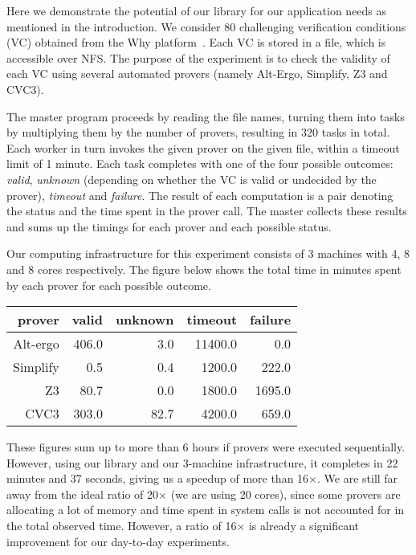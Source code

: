 \documentclass[tfpsymp,pagenumbers]{tfp07symp}
\begin{document}
Here we demonstrate the potential of our library for our application
needs as mentioned in the introduction. 
We consider 80 challenging verification conditions
(VC) obtained from the Why platform~\cite{filliatre07cav}.  Each
VC is stored in a file, which is accessible over
NFS. The purpose of the experiment is to check the validity of each VC
using several automated provers (namely Alt-Ergo, Simplify, Z3 and CVC3).

The master program proceeds by reading the file names, turning them
into tasks by multiplying them by the number of provers, resulting in
320 tasks in total.
Each worker in turn invokes the given prover on the given file, within
a timeout limit of 1 minute.
Each task completes with one of the four possible outcomes: \emph{valid},
\emph{unknown} (depending on
whether the VC is valid or undecided by the prover), 
\emph{timeout} and \emph{failure}.
The result of each computation is a pair denoting the status and the
time spent in the prover call. The master collects these results and
sums up the timings for each prover and each possible status.

Our computing
infrastructure for this experiment consists of 3 machines with 4, 8 and 8 cores
respectively. 
The figure below shows the total time in minutes spent by each prover
for each possible outcome.
\begin{center}
  \begin{tabular}{|r||r|r|r|r|}
    \hline
    prover   & valid & unknown & timeout & failure
    \\\hline\hline
    Alt-ergo & 406.0 & 3.0   &  11400.0 & 0.0       
    \\\hline
    Simplify &  0.5   & 0.4   &  1200.0 & 222.0   
    \\\hline
    Z3       & 80.7   & 0.0   &  1800.0 & 1695.0   
    \\\hline
    CVC3     & 303.0  & 82.7  &  4200.0 & 659.0   
    \\\hline
  \end{tabular}
\end{center}
These figures sum up to more than 6 hours if provers were executed
sequentially. However, using our library and our 3-machine
infrastructure, it completes in 22 minutes and 37 seconds, giving us a
speedup of more than 16$\times$. We are still far away from the ideal
ratio of 20$\times$ (we are using 20 cores), since some provers are
allocating a lot of memory and time spent in system calls is not
accounted for in the total observed time. However, a ratio of
16$\times$ is already a significant improvement for our day-to-day
experiments. 
\end{document}
